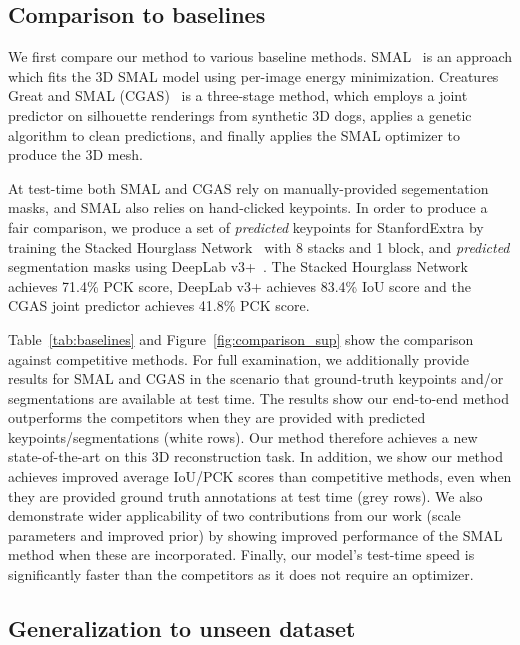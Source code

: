   
  
  \subsection{Comparison to baselines}
  
  We first compare our method to various baseline methods. SMAL~\cite{DBLP:journals/corr/ZuffiKJB16} is an approach which fits the 3D SMAL model using per-image energy minimization. Creatures Great and SMAL (CGAS)~\cite{biggs2018creatures} is a three-stage method, which employs a joint predictor on silhouette renderings from synthetic 3D dogs, applies a genetic algorithm to clean predictions, and finally applies the SMAL optimizer to produce the 3D mesh.
  
  At test-time both SMAL and CGAS rely on manually-provided segementation masks, and SMAL also relies on hand-clicked keypoints. In order to produce a fair comparison, we produce a set of \emph{predicted} keypoints for StanfordExtra by training the Stacked Hourglass Network~\cite{newell2016stacked} with 8 stacks and 1 block, and \emph{predicted} segmentation masks using DeepLab v3+~\cite{journals/corr/ChenPK0Y16}. The Stacked Hourglass Network achieves 71.4\% PCK score, DeepLab v3+ achieves 83.4\% IoU score and the CGAS joint predictor achieves 41.8\% PCK score. 
  
  Table~\ref{tab:baselines} and Figure~\ref{fig:comparison_sup} show the comparison against competitive methods. For full examination, we additionally provide results for SMAL and CGAS in the scenario that ground-truth keypoints and/or segmentations are available at test time. 
  The results show our end-to-end method outperforms the competitors when they are provided with predicted keypoints/segmentations (white rows). Our method therefore achieves a new state-of-the-art on this 3D reconstruction task. In addition, we show our method achieves improved average IoU/PCK scores than competitive methods, even when they are provided ground truth annotations at test time (grey rows). We also demonstrate wider applicability of two contributions from our work (scale parameters and improved prior) by showing improved performance of the SMAL method when these are incorporated. Finally, our model's test-time speed is significantly faster than the competitors as it does not require an optimizer.
  
  
  
  
  
  
  \subsection{Generalization to unseen dataset}
  
